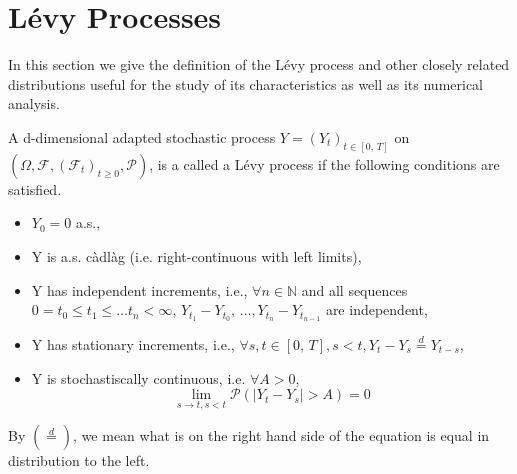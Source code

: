 \section{L\'evy Processes}
In this section we give the definition of the L\'evy process and other closely related distributions useful for the study of its characteristics as well as its numerical analysis.
\begin{definition} A d-dimensional adapted stochastic process $Y = (Y_t)_{t \in [0, \, T]}$ on $(\Omega , \mathcal{F}, (\mathcal{F}_t)_{t \geq 0}, \mathcal{P})$, is a called a L\'evy process if the following conditions are satisfied.
\begin{itemize}
    \item $Y_0 = 0 $ a.s.,
    \item Y is a.s. c\`adl\`ag (i.e. right-continuous with left limits),
    \item Y has independent increments, i.e., $\forall n \in \mathbb{N} $ and all sequences $0 = t_0 \leq t_1 \leq \ldots t_n < \infty $, $Y_{t_1} - Y_{t_0}, \, \ldots, Y_{t_n} - Y_{t_{n-1}}$ are independent,
    \item Y has stationary increments, i.e., $\forall s,t \in [0, \, T], s<t, Y_t - Y_s \overset{d}{=} Y_{t-s}$,
    \item Y is stochastiscally continuous, i.e. $\forall A>0 $, $$ \lim_{s \to t , s<t}\mathcal{P} (|Y_t - Y_s |>A) =0$$
\end{itemize}
\end{definition}
\begin{remark}
By $(\overset{d}{=})$, we mean what is on the right hand side of the equation is equal in distribution to the left.
\end{remark}

